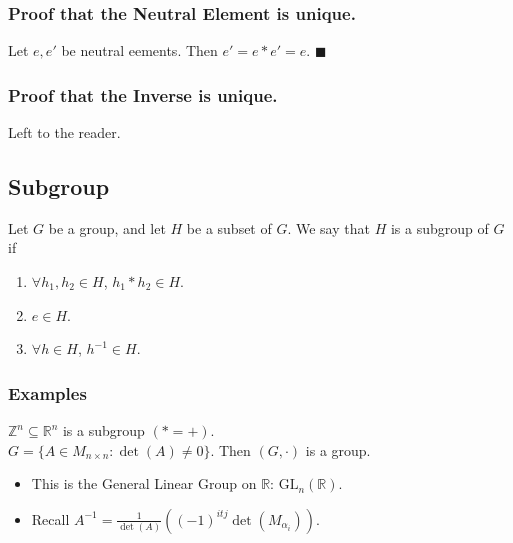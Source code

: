 \documentclass[11pt]{article}
\newcommand{\0}{\emptyset}
\newcommand{\Z}{\mathbb{Z}}
\newcommand{\R}{\mathbb{R}}
\begin{document}
\subsubsection*{Proof that the Neutral Element is unique.}
\label{sec:org91f6295}
Let \(e,e'\) be neutral eements. Then \(e'=e*e'=e\). \(\blacksquare\)\\[0pt]
\subsubsection*{Proof that the Inverse is unique.}
\label{sec:org872ae1e}
Left to the reader.\\[0pt]
\subsection*{Subgroup}
\label{sec:org2be8482}
Let \(G\) be a group, and let \(H\) be a subset of \(G\). We say that \(H\) is a subgroup of \(G\) if\\[0pt]
\begin{enumerate}
\item \(\forall h_{1},h_{2}\in H\), \(h_{1}*h_{2}\in H\).\\[0pt]
\item \(e\in H\).\\[0pt]
\item \(\forall h\in H\), \(h^{-1}\in H\).\\[0pt]
\end{enumerate}
\subsubsection*{Examples}
\label{sec:org2c4d9a6}
\(\Z^{n}\subseteq \R^{n}\) is a subgroup \((*=+)\).\\[0pt]
\(G=\{A\in M_{n\times n}:\det(A)\neq 0\}\). Then \((G,\cdot)\) is a group.\\[0pt]
\begin{itemize}
\item This is the General Linear Group on \(\R\): \(\text{GL}_{n}(\R)\).\\[0pt]
\item Recall \(A^{-1}=\frac{1}{\det(A)}\left( (-1)^{itj}\det(M_{\alpha_{i}}) \right)\).\\[0pt]
\end{itemize}
\end{document}
